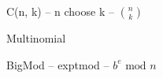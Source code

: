 

\begin{algorithm}{C(n, k) -- n choose k -- ${n \choose k}$}
\end{algorithm}

\begin{algorithm}{Multinomial}
\end{algorithm}

\begin{algorithm}{BigMod -- exptmod -- $b^e \textrm{ mod } n$}
\end{algorithm}
